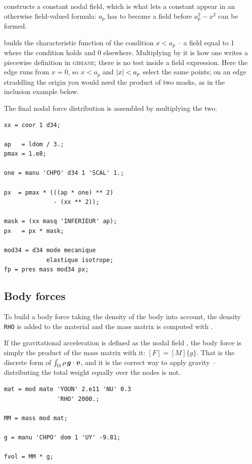 \begin{castemcom}
  constructs a constant
nodal field, which is what lets a constant appear in an otherwise
field-valued formula: $a_p$ has to become a field before $a_p^2-x^2$ can be
formed.

  builds the
characteristic function of the condition
$x<a_{p}$ -- a field equal to 1 where the condition holds and 0 elsewhere.
Multiplying by it is how one writes a piecewise definition in
\textsc{gibiane}; there is no  test inside a field expression. Here
the edge runs from $x=0$, so $x<a_p$ and $\lvert x\rvert<a_p$ select the same
points; on an edge straddling the origin you would need the product of two
masks, as in the inclusion example below.

The final nodal force distribution is assembled by multiplying the two.
\end{castemcom}
\begin{castemlines}
\begin{verbatim}
xx = coor 1 d34;

ap   = ldom / 3.;
pmax = 1.e8;

one = manu 'CHPO' d34 1 'SCAL' 1.;

px  = pmax * (((ap * one) ** 2)
              - (xx ** 2));

mask = (xx masq 'INFERIEUR' ap);
px   = px * mask;

mod34 = d34 mode mecanique
            elastique isotrope;
fp = pres mass mod34 px;
\end{verbatim}
\end{castemlines}

\subsection{Body forces}

\begin{castemcom}
To build a body force taking the density of the body into account, the
density \texttt{RHO} is added to the material and the mass matrix is computed
with .

If the gravitational acceleration is defined as the nodal field , the
body force is simply the product of the mass matrix with it: $[F]=[M]\{g\}$.
That is the discrete form of $\int_\Omega \rho\, \bm{g}\cdot\bm{v}$, and
it is the correct way to apply gravity -- distributing the total weight
equally over the nodes is not.
\end{castemcom}
\begin{castemlines}
\begin{verbatim}
mat = mod mate 'YOUN' 2.e11 'NU' 0.3
               'RHO' 2000.;

MM = mass mod mat;

g = manu 'CHPO' dom 1 'UY' -9.81;

fvol = MM * g;
\end{verbatim}
\end{castemlines}

